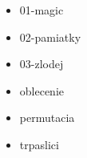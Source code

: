 



\begin{itemize}
\item 01-magic
\item 02-pamiatky
\item 03-zlodej
\item oblecenie
\item permutacia
\item trpaslici
\end{itemize}


